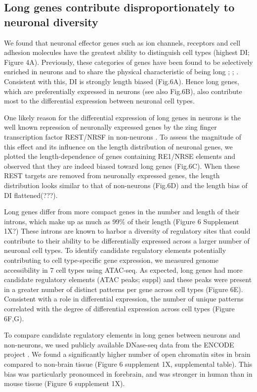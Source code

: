 \subsection{Long genes contribute disproportionately to neuronal diversity}

We found that neuronal effector genes such as ion channels, receptors and cell adhesion molecules have the greatest ability to distinguish cell types (highest DI; Figure 4A). Previously, these categories of genes have been found to be selectively enriched in neurons and to share the physical characteristic of being long \cite{Sugino_2014}; \cite{Gabel_2015}; \cite{Zylka_2015}. Consistent with this, DI is strongly length biased (Fig.6A). Hence long genes, which are preferentially expressed in neurons (see also Fig.6B), also contribute most to the differential expression between neuronal cell types. 

One likely reason for the differential expression of long genes in neurons is the well known repression of neuronally expressed genes by the zing finger transcription factor REST/NRSF in non-neurons \cite{RN1}\cite{RN2a}. To assess the magnitude of this effect and its influence on the length distribution of neuronal genes, we plotted the length-dependence of genes containing RE1/NRSE elements and observed that they are indeed biased toward long genes (Fig.6C). When these REST targets are removed from neuronally expressed genes, the length distribution looks similar to that of non-neurons (Fig.6D) and the length bias of DI flattened(???).

Long genes differ from more compact genes in the number and length of their introns, which make up as much as 99\% of their length (Figure 6 Supplement 1X?) These introns are known to harbor a diversity of regulatory sites that could contribute to their ability to be differentially expressed across a larger number of neuronal cell types. To identify candidate regulatory elements potentially contributing to cell type-specific gene expression, we measured genome accessibility in 7 cell types using ATAC-seq. As expected, long genes had more candidate regulatory elements (ATAC peaks; suppl) and these peaks were present in a greater number of distinct patterns per gene across cell types (Figure 6E). Consistent with a role in differential expression, the number of unique patterns correlated with the degree of differential expression across cell types (Figure 6F,G).

To compare candidate regulatory elements in long genes between neurons and non-neurons, we used publicly available DNase-seq data from the ENCODE project \cite{Dunham_2012}. We found a significantly higher number of open chromatin sites in brain compared to non-brain tissue (Figure 6 supplement 1X, supplemental table). This bias was  particularly pronounced in forebrain, and was stronger in human than in mouse tissue (Figure 6 supplement 1X).